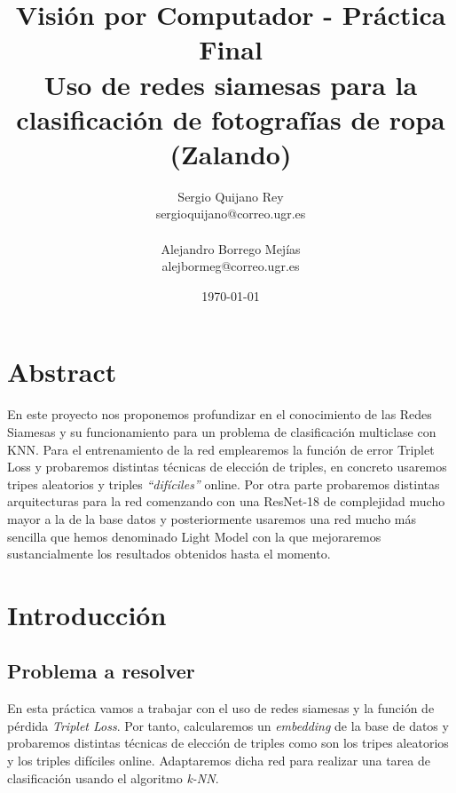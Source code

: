 \documentclass[11pt]{article}
\title{
    {Visión por Computador - Práctica Final} \\
    {Uso de redes siamesas para la clasificación de fotografías de ropa (Zalando)}
}
\author{
    {Sergio Quijano Rey}\\
    {sergioquijano@correo.ugr.es} \\
    {}\\
    {Alejandro Borrego Mejías} \\
    {alejbormeg@correo.ugr.es}\\
}
\date{\today}
\newcommand{\entrecomillado}[1]{\emph{``#1''}}
\begin{document}
\maketitle
\pagebreak

\tableofcontents


\listoffigures

\listoftables

{}

\pagebreak

\section{Abstract}

En este proyecto nos proponemos profundizar en el conocimiento de las Redes Siamesas y su funcionamiento para un problema de clasificación multiclase con KNN. Para el entrenamiento de la red emplearemos la función de error Triplet Loss y probaremos distintas técnicas de elección de triples, en concreto usaremos tripes aleatorios y triples \entrecomillado{difíciles} online. Por otra parte probaremos distintas arquitecturas para la red comenzando con una ResNet-18 de complejidad mucho mayor a la de la base datos y posteriormente usaremos una red mucho más sencilla que hemos denominado Light Model con la que mejoraremos sustancialmente los resultados obtenidos hasta el momento.

\section{Introducción}

\subsection{Problema a resolver}

En esta práctica vamos a trabajar con el uso de redes siamesas y la función de pérdida \emph{Triplet Loss}. Por tanto, calcularemos un \emph{embedding} de la base de datos y probaremos distintas técnicas de elección de triples como son los tripes aleatorios y los triples difíciles online. Adaptaremos dicha red para realizar una tarea de clasificación usando el algoritmo \emph{k-NN}.
\end{document}
